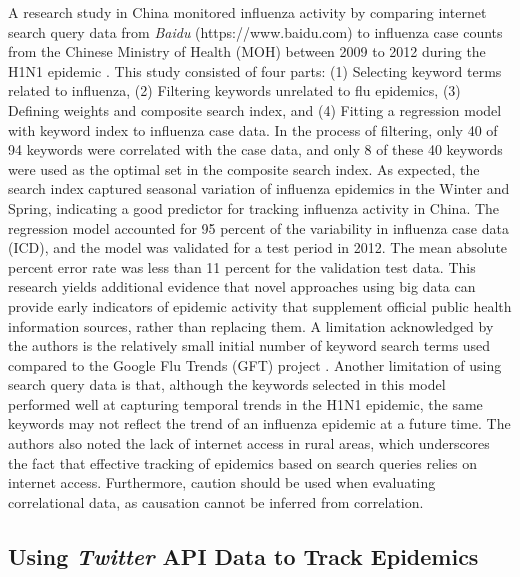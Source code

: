 \documentclass[sigconf]{acmart}
\begin{document}
A research study in China monitored influenza activity by comparing internet search query 
data from {\it Baidu} (https://www.baidu.com) to influenza case counts from the Chinese 
Ministry of Health (MOH) between 2009 to 2012 during the H1N1 epidemic \cite{yuan13}. 
This study consisted of four parts: (1) Selecting keyword terms related to influenza, (2) 
Filtering keywords unrelated to flu epidemics, (3) Defining weights and composite search 
index, and (4) Fitting a regression model with keyword index to influenza case data. In the 
process of filtering, only 40 of 94 keywords were correlated with the case data, and only 8 
of these 40 keywords were used as the optimal set in the composite search index. As expected,
the search index captured seasonal variation of influenza epidemics in the Winter and Spring,
indicating a good predictor for tracking influenza activity in China.  The regression model 
accounted for 95 percent of the variability in influenza case data (ICD), and the model was 
validated for a test period in 2012. The mean absolute percent error rate was less than 11 
percent for the validation test data. This research yields additional evidence that novel 
approaches using big data can provide early indicators of epidemic activity that supplement 
official public health information sources, rather than replacing them. A limitation 
acknowledged by the authors is the relatively small initial number of keyword search terms 
used compared to the Google Flu Trends (GFT) project \cite{ginsburg09}. Another limitation 
of using search query data is that, although the keywords selected in this model performed 
well at capturing temporal trends in the H1N1 epidemic, the same keywords may not reflect 
the trend of an influenza epidemic at a future time. The authors also noted the lack of 
internet access in rural areas, which underscores the fact that effective tracking of 
epidemics based on search queries relies on internet access. Furthermore, caution should 
be used when evaluating correlational data, as causation cannot be inferred from correlation.

\subsection{Using {\itshape Twitter} API Data to Track Epidemics}
\end{document}
